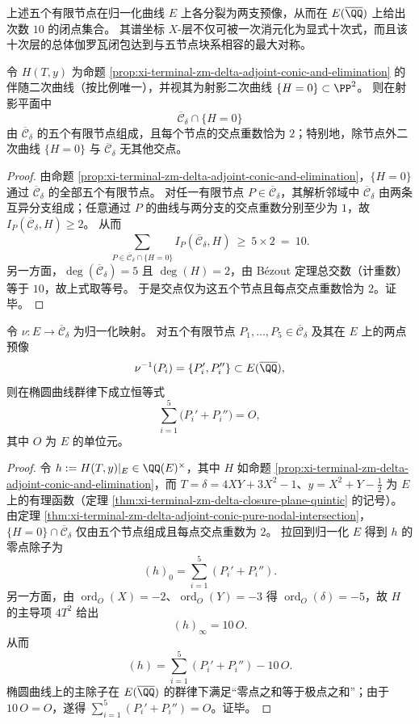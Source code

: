 上述五个有限节点在归一化曲线 \(E\) 上各分裂为两支预像，从而在 \(E(\overline{\QQ})\) 上给出次数 \(10\) 的闭点集合。
其谱坐标 \(X\)-层不仅可被一次消元化为显式十次式，而且该十次层的总体伽罗瓦闭包达到与五节点块系相容的最大对称。

\begin{theorem}\label{thm:xi-terminal-zm-delta-adjoint-conic-pure-nodal-intersection}
令 \(H(T,y)\) 为命题 \ref{prop:xi-terminal-zm-delta-adjoint-conic-and-elimination} 的伴随二次曲线（按比例唯一），并视其为射影二次曲线 \(\{H=0\}\subset\PP^2\)。
则在射影平面中
\[
\overline{\mathcal C}_\delta\cap\{H=0\}
\]
由 \(\overline{\mathcal C}_\delta\) 的五个有限节点组成，且每个节点的交点重数恰为 \(2\)；特别地，除节点外二次曲线 \(\{H=0\}\) 与 \(\overline{\mathcal C}_\delta\) 无其他交点。
\end{theorem}
\begin{proof}
由命题 \ref{prop:xi-terminal-zm-delta-adjoint-conic-and-elimination}，\(\{H=0\}\) 通过 \(\overline{\mathcal C}_\delta\) 的全部五个有限节点。
对任一有限节点 \(P\in\overline{\mathcal C}_\delta\)，其解析邻域中 \(\overline{\mathcal C}_\delta\) 由两条互异分支组成；任意通过 \(P\) 的曲线与两分支的交点重数分别至少为 \(1\)，故
\(
I_P(\overline{\mathcal C}_\delta,H)\ge 2
\)。
从而
\[
\sum_{P\in \overline{\mathcal C}_\delta\cap\{H=0\}} I_P(\overline{\mathcal C}_\delta,H)\ \ge\ 5\times 2\ =\ 10.
\]
另一方面，\(\deg(\overline{\mathcal C}_\delta)=5\) 且 \(\deg(H)=2\)，由 Bézout 定理总交数（计重数）等于 \(10\)，故上式取等号。
于是交点仅为这五个节点且每点交点重数恰为 \(2\)。证毕。
\end{proof}

\begin{theorem}[节点预像十点在椭圆曲线群上的严格求和恒等式]\label{thm:xi-terminal-zm-delta-node-preimage-sum-zero}
令 \(\nu:E\to\overline{\mathcal C}_\delta\) 为归一化映射。
对五个有限节点 \(P_1,\dots,P_5\in\overline{\mathcal C}_\delta\) 及其在 \(E\) 上的两点预像
\[
\nu^{-1}(P_i)=\{P_i',P_i''\}\subset E(\overline{\QQ}),
\]
则在椭圆曲线群律下成立恒等式
\[
\sum_{i=1}^{5}\bigl(P_i'+P_i''\bigr)=O,
\]
其中 \(O\) 为 \(E\) 的单位元。
\end{theorem}
\begin{proof}
令 \(h:=H(T,y)|_{E}\in\QQ(E)^\times\)，其中 \(H\) 如命题 \ref{prop:xi-terminal-zm-delta-adjoint-conic-and-elimination}，而 \(T=\delta=4XY+3X^2-1\)、\(y=X^2+Y-\tfrac12\) 为 \(E\) 上的有理函数（定理 \ref{thm:xi-terminal-zm-delta-closure-plane-quintic} 的记号）。
由定理 \ref{thm:xi-terminal-zm-delta-adjoint-conic-pure-nodal-intersection}，\(\{H=0\}\cap \overline{\mathcal C}_\delta\) 仅由五个节点组成且每点交点重数为 \(2\)。
拉回到归一化 \(E\) 得到 \(h\) 的零点除子为
\[
(h)_0=\sum_{i=1}^{5}(P_i'+P_i'').
\]
另一方面，由 \(\operatorname{ord}_O(X)=-2\)、\(\operatorname{ord}_O(Y)=-3\) 得 \(\operatorname{ord}_O(\delta)=-5\)，故 \(H\) 的主导项 \(4T^2\) 给出
\[
(h)_\infty=10\,O.
\]
从而
\[
(h)=\sum_{i=1}^{5}(P_i'+P_i'')-10\,O.
\]
椭圆曲线上的主除子在 \(E(\overline{\QQ})\) 的群律下满足“零点之和等于极点之和”；由于 \(10\,O=O\)，遂得 \(\sum_{i=1}^5(P_i'+P_i'')=O\)。证毕。
\end{proof}

